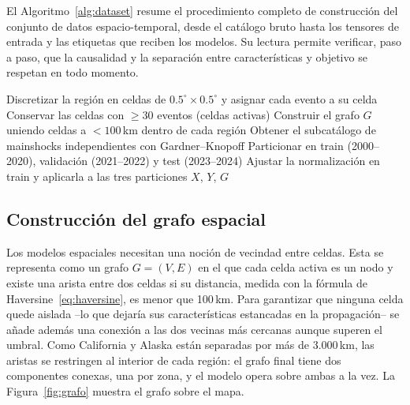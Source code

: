 El Algoritmo~\ref{alg:dataset} resume el procedimiento completo de construcción del conjunto
de datos espacio-temporal, desde el catálogo bruto hasta los tensores de entrada y las
etiquetas que reciben los modelos. Su lectura permite verificar, paso a paso, que la
causalidad y la separación entre características y objetivo se respetan en todo momento.

\begin{algorithm}[ht!]
  \caption{Construcción del conjunto de datos espacio-temporal}
  \label{alg:dataset}
  \DontPrintSemicolon
  Discretizar la región en celdas de $0.5^{\circ}\times 0.5^{\circ}$ y asignar cada evento a su celda\;
  Conservar las celdas con $\geq 30$ eventos (celdas activas)\;
  Construir el grafo $G$ uniendo celdas a $<100$\,km dentro de cada región\;
  Obtener el subcatálogo de mainshocks independientes con Gardner--Knopoff\;
  Particionar en train (2000--2020), validación (2021--2022) y test (2023--2024)\;
  Ajustar la normalización en train y aplicarla a las tres particiones\;
  \Return $X$, $Y$, $G$\;
\end{algorithm}

\subsection{Construcción del grafo espacial}
\label{md-grafo}

Los modelos espaciales necesitan una noción de vecindad entre celdas. Esta se representa
como un grafo \(G=(V,E)\) en el que cada celda activa es un nodo y existe una arista entre
dos celdas si su distancia, medida con la fórmula de Haversine~\eqref{eq:haversine}, es
menor que 100\,km. Para garantizar que ninguna celda quede aislada --lo que dejaría sus
características estancadas en la propagación-- se añade además una conexión a las dos vecinas
más cercanas aunque superen el umbral. Como California y Alaska están separadas por más de
3.000\,km, las aristas se restringen al interior de cada región: el grafo final tiene dos
componentes conexas, una por zona, y el modelo opera sobre ambas a la vez. La
Figura~\ref{fig:grafo} muestra el grafo sobre el mapa.

